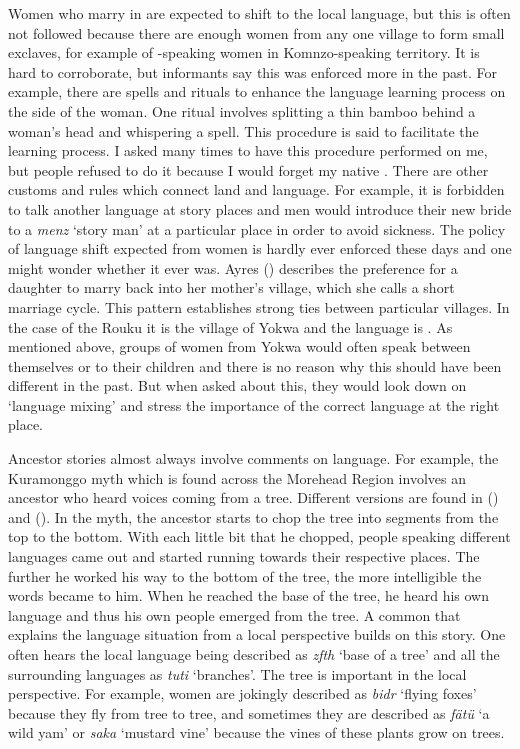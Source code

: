 Women who marry in are expected to shift to the local language, but this is often not followed because there are enough women from any one village to form small exclaves, for example of -speaking women in Komnzo-speaking territory. It is hard to corroborate, but informants say this was enforced more in the past. For example, there are spells and rituals to enhance the language learning process on the side of the woman. One ritual involves splitting a thin bamboo behind a woman's head and whispering a spell. This procedure is said to facilitate the learning process. I asked many times to have this procedure performed on me, but people refused to do it because I would forget my native . There are other customs and rules which connect land and language. For example, it is forbidden to talk another language at story places and men would introduce their new bride to a \textit{menz} `story man' at a particular place in order to avoid sickness. The policy of language shift expected from women is hardly ever enforced these days and one might wonder whether it ever was. Ayres (\citeyear[226]{Ayres:ws}) describes the preference for a daughter to marry back into her mother's village, which she calls a short marriage cycle. This pattern establishes strong ties between particular villages. In the case of the Rouku it is the village of Yokwa and the language is . As mentioned above, groups of women from Yokwa would often speak  between themselves or to their children and there is no reason why this should have been different in the past. But when asked about this, they would look down on `language mixing' and stress the importance of the correct language at the right place.

Ancestor stories almost always involve comments on language. For example, the Kuramonggo myth which is found across the Morehead Region involves an ancestor who heard voices coming from a tree. Different versions are found in (\citealt[299]{Williams:1936transfly}) and (\citealt[102]{Ayres:ws}). In the myth, the ancestor starts to chop the tree into segments from the top to the bottom. With each little bit that he chopped, people speaking different languages came out and started running towards their respective places. The further he worked his way to the bottom of the tree, the more intelligible the words became to him. When he reached the base of the tree, he heard his own language and thus his own people emerged from the tree. A common  that explains the language situation from a local perspective builds on this story. One often hears the local language being described as \emph{zfth} `base of a tree' and all the surrounding languages as \emph{tuti} `branches'. The tree  is important in the local perspective. For example, women are jokingly described as \textit{bidr} `flying foxes' because they fly from tree to tree, and sometimes they are described as \textit{fätü} `a wild yam' or \textit{saka} `mustard vine' because the vines of these plants grow on trees.

